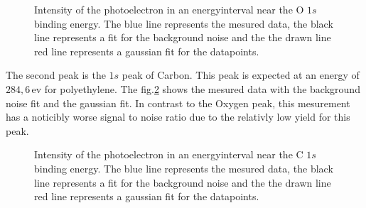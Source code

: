 \documentclass[numbers=noenddot,a4paper]{article}
\begin{document}
	\begin{figure}[t]
		\centering
		\caption{Intensity of the photoelectron in an energyinterval near the O $1s$ binding energy. The blue line represents the mesured data, the black line represents a fit for the background noise and the  the drawn line red line represents a gaussian fit for the datapoints.}
		\label{fig:O2}
	\end{figure}
	
	The second peak is the $1s$ peak of Carbon. This peak is expected at an energy of $284,6\,\mathrm{ev}$ for polyethylene. The fig.\ref{fig:C1s} shows the mesured data with the background noise fit and the gaussian fit. In contrast to the Oxygen peak, this mesurement has a noticibly worse signal to noise ratio due to the relativly low yield for this peak.\\
	
	\begin{figure}[!H]
		\centering
		\caption{Intensity of the photoelectron in an energyinterval near the C $1s$ binding energy. The blue line represents the mesured data, the black line represents a fit for the background noise and the  the drawn line red line represents a gaussian fit for the datapoints.}
		\label{fig:C1s}
	\end{figure}
	
\end{document}
